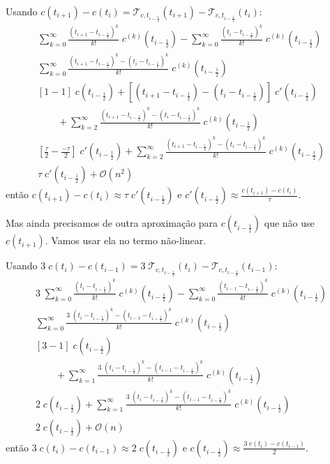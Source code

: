 \documentclass[a4paper]{article}
\begin{document}
Usando
\(
    c(t_{i+1}) - c(t_i)
    =
    \mathcal{T}_{c,t_{i-\frac12}}(t_{i+1})
    - \mathcal{T}_{c,t_{i-\frac12}}(t_i)
\):
\[ \begin{array}{l} \displaystyle
    \sum_{k=0}^{\infty} \frac{(t_{i+1} - t_{i-\frac12})^k}{k!} \; c^{(k)}(t_{i-\frac12})
    - \sum_{k=0}^{\infty} \frac{(t_i - t_{i-\frac12})^k}{k!} \; c^{(k)}(t_{i-\frac12})
    \\ \displaystyle
    \sum_{k=0}^{\infty} \frac{(t_{i+1} - t_{i-\frac12})^k - (t_i - t_{i-\frac12})^k}{k!} \; c^{(k)}(t_{i-\frac12})
    \\ \displaystyle
    \left[1 - 1\right] \; c(t_{i-\frac12})
    + \left[ (t_{i+1} - t_{i-\frac12}) - (t_i - t_{i-\frac12}) \right] \; c'(t_{i-\frac12})
    \\\qquad \displaystyle
    + \sum_{k=2}^{\infty} \frac{(t_{i+1} - t_{i-\frac12})^k - (t_i - t_{i-\frac12})^k}{k!} \; c^{(k)}(t_{i-\frac12})
    \\ \displaystyle
    \left[ \frac{\tau}{2} - \frac{-\tau}{2} \right] \; c'(t_{i-\frac12})
    + \sum_{k=2}^{\infty} \frac{(t_{i+1} - t_{i-\frac12})^k - (t_i - t_{i-\frac12})^k}{k!} \; c^{(k)}(t_{i-\frac12})
    \\ \displaystyle
    \tau \; c'(t_{i-\frac12})
    + \mathcal{O}(n^2)
\end{array} \]
então \(
    c(t_{i+1}) - c(t_i)
    \approx
    \tau \; c'(t_{i-\frac12})
\) e \(
    c'(t_{i-\frac12})
    \approx
    \frac{c(t_{i+1}) - c(t_i)}{\tau}
\).

Mas ainda precisamos de outra aproximação
para \(c(t_{i-\frac12})\)
que não use \(c(t_{i+1})\).
Vamos usar ela no termo não-linear.

Usando
\(
    3 \; c(t_i) - c(t_{i-1})
    =
    3 \; \mathcal{T}_{c,t_{i-\frac12}}(t_i)
    - \mathcal{T}_{c,t_{i-\frac12}}(t_{i-1})
\):
\[ \begin{array}{l} \displaystyle
    3 \; \sum_{k=0}^{\infty} \frac{(t_i - t_{i-\frac12})^k}{k!} \; c^{(k)}(t_{i-\frac12})
    - \sum_{k=0}^{\infty} \frac{(t_{i-1} - t_{i-\frac12})^k}{k!} \; c^{(k)}(t_{i-\frac12})
    \\ \displaystyle
    \sum_{k=0}^{\infty} \frac{3 \; (t_i - t_{i-\frac12})^k - (t_{i-1} - t_{i-\frac12})^k}{k!} \; c^{(k)}(t_{i-\frac12})
    \\ \displaystyle
    \left[3 - 1\right] \; c(t_{i-\frac12})
    \\\qquad \displaystyle
    + \sum_{k=1}^{\infty} \frac{3 \; (t_i - t_{i-\frac12})^k - (t_{i-1} - t_{i-\frac12})^k}{k!} \; c^{(k)}(t_{i-\frac12})
    \\ \displaystyle
    2 \; c(t_{i-\frac12})
    + \sum_{k=1}^{\infty} \frac{3 \; (t_i - t_{i-\frac12})^k - (t_{i-1} - t_{i-\frac12})^k}{k!} \; c^{(k)}(t_{i-\frac12})
    \\ \displaystyle
    2 \; c(t_{i-\frac12})
    + \mathcal{O}(n)
\end{array} \]
então \(
    3 \; c(t_i) - c(t_{i-1})
    \approx
    2 \; c(t_{i-\frac12})
\) e \(
    c(t_{i-\frac12})
    \approx
    \frac{3 \; c(t_i) - c(t_{i-1})}{2}
\).
\end{document}
